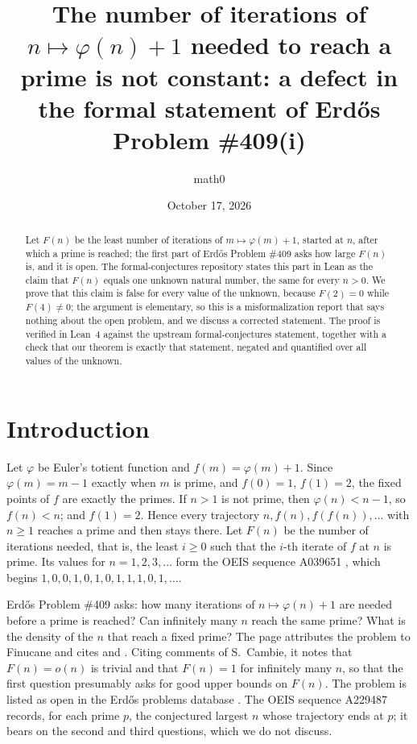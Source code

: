 \documentclass[11pt]{amsart}
\title[The iteration count of $n\mapsto\varphi(n)+1$ is not constant]{The number of iterations of $n\mapsto\varphi(n)+1$ needed to reach a prime is not constant: a defect in the formal statement of Erd\H{o}s Problem \#409(i)}
\author{math0}
\date{October 17, 2026}
\theoremstyle{plain}
\theoremstyle{definition}
\begin{document}
\begin{abstract}
Let $F(n)$ be the least number of iterations of $m\mapsto\varphi(m)+1$, started at $n$, after which a prime is reached; the first part of Erd\H{o}s Problem \#409 asks how large $F(n)$ is, and it is open. The formal-conjectures repository states this part in Lean as the claim that $F(n)$ equals one unknown natural number, the same for every $n>0$. We prove that this claim is false for every value of the unknown, because $F(2)=0$ while $F(4)\ne 0$; the argument is elementary, so this is a misformalization report that says nothing about the open problem, and we discuss a corrected statement. The proof is verified in Lean~4 against the upstream formal-conjectures statement, together with a check that our theorem is exactly that statement, negated and quantified over all values of the unknown.
\end{abstract}
\maketitle

\section{Introduction}

Let $\varphi$ be Euler's totient function and $f(m)=\varphi(m)+1$. Since $\varphi(m)=m-1$ exactly when $m$ is prime, and $f(0)=1$, $f(1)=2$, the fixed points of $f$ are exactly the primes. If $n>1$ is not prime, then $\varphi(n)<n-1$, so $f(n)<n$; and $f(1)=2$. Hence every trajectory $n,f(n),f(f(n)),\dots$ with $n\ge 1$ reaches a prime and then stays there. Let $F(n)$ be the number of iterations needed, that is, the least $i\ge 0$ such that the $i$-th iterate of $f$ at $n$ is prime. Its values for $n=1,2,3,\dots$ form the OEIS sequence A039651 \cite{OEIS-A039651}, which begins $1,0,0,1,0,1,0,1,1,1,0,1,\dots$.

Erd\H{o}s Problem \#409 \cite{EP409} asks: how many iterations of $n\mapsto\varphi(n)+1$ are needed before a prime is reached? Can infinitely many $n$ reach the same prime? What is the density of the $n$ that reach a fixed prime? The page attributes the problem to Finucane and cites \cite[p.~81]{ErGr80} and \cite[Problem~B41]{Gu04}. Citing comments of S.~Cambie, it notes that $F(n)=o(n)$ is trivial and that $F(n)=1$ for infinitely many $n$, so that the first question presumably asks for good upper bounds on $F(n)$. The problem is listed as open in the Erd\H{o}s problems database \cite{EPdb}. The OEIS sequence A229487 \cite{OEIS-A229487} records, for each prime $p$, the conjectured largest $n$ whose trajectory ends at $p$; it bears on the second and third questions, which we do not discuss.
\end{document}
